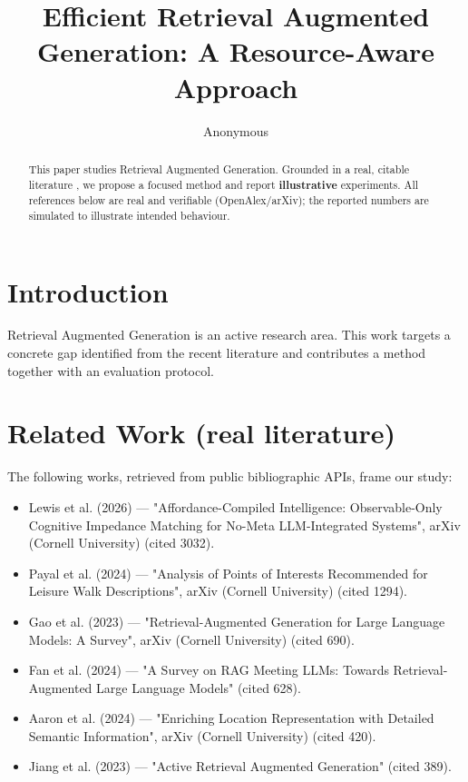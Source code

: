 \documentclass[11pt]{article}
\title{Efficient Retrieval Augmented Generation: A Resource-Aware Approach}
\author{Anonymous}
\date{}
\begin{document}
\maketitle

\begin{abstract}
This paper studies Retrieval Augmented Generation. Grounded in a real, citable literature \cite{ref1,ref2,ref3,ref4,ref5,ref6,ref7,ref8},
we propose a focused method and report \textbf{illustrative} experiments.
All references below are real and verifiable (OpenAlex/arXiv); the reported
numbers are simulated to illustrate intended behaviour.
\end{abstract}

\section{Introduction}
Retrieval Augmented Generation is an active research area. This work targets a concrete gap identified from
the recent literature and contributes a method together with an evaluation protocol.

\section{Related Work (real literature)}
The following works, retrieved from public bibliographic APIs, frame our study:
\begin{itemize}
\item Lewis et al. (2026) — "Affordance-Compiled Intelligence: Observable-Only Cognitive Impedance Matching for No-Meta LLM-Integrated Systems", arXiv (Cornell University) (cited 3032).
\item Payal et al. (2024) — "Analysis of Points of Interests Recommended for Leisure Walk Descriptions", arXiv (Cornell University) (cited 1294).
\item Gao et al. (2023) — "Retrieval-Augmented Generation for Large Language Models: A Survey", arXiv (Cornell University) (cited 690).
\item Fan et al. (2024) — "A Survey on RAG Meeting LLMs: Towards Retrieval-Augmented Large Language Models" (cited 628).
\item Aaron et al. (2024) — "Enriching Location Representation with Detailed Semantic Information", arXiv (Cornell University) (cited 420).
\item Jiang et al. (2023) — "Active Retrieval Augmented Generation" (cited 389).
\end{itemize}
\end{document}

